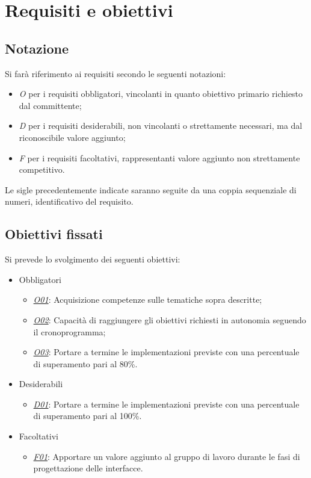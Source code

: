 
\section{Requisiti e obiettivi}
\label{sec:requisiti-obiettivi}
\subsection*{Notazione}
Si farà riferimento ai requisiti secondo le seguenti notazioni:
\begin{itemize}
	\item \textit{O} per i requisiti obbligatori, vincolanti in quanto obiettivo primario richiesto dal committente;
	\item \textit{D} per i requisiti desiderabili, non vincolanti o strettamente necessari,
		  ma dal riconoscibile valore aggiunto;
	\item \textit{F} per i requisiti facoltativi, rappresentanti valore aggiunto non strettamente 
		  competitivo.
\end{itemize}

Le sigle precedentemente indicate saranno seguite da una coppia sequenziale di numeri, identificativo del requisito.

\subsection*{Obiettivi fissati}
Si prevede lo svolgimento dei seguenti obiettivi:
\begin{itemize}
	\item Obbligatori
	\begin{itemize}
		\item \underline{\textit{O01}}: Acquisizione competenze sulle tematiche sopra descritte;
    	\item \underline{\textit{O02}}: Capacità di raggiungere gli obiettivi richiesti in autonomia seguendo il cronoprogramma;
    	\item \underline{\textit{O03}}: Portare a termine le implementazioni previste con una percentuale di superamento pari al
         80\%.
	\end{itemize}
	
	\item Desiderabili 
	\begin{itemize}
		\item \underline{\textit{D01}}: Portare a termine le implementazioni previste con una percentuale di superamento pari al 100\%.
	\end{itemize}
	
	\item Facoltativi
	\begin{itemize}
		\item \underline{\textit{F01}}: Apportare un valore aggiunto al gruppo di lavoro durante le fasi di progettazione delle interfacce.
	\end{itemize} 
\end{itemize}

